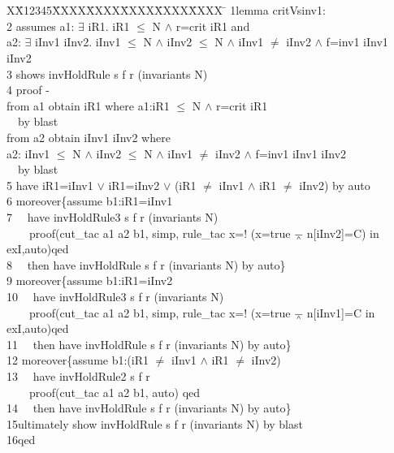 \documentclass{llncs}
\newlength{\fminilength}
\newenvironment{fmini}[1][\linewidth]
  {\setlength{\fminilength}{#1\fboxsep-2\fboxrule}%
   \vspace{2ex}\noindent\begin{lrbox}{\fminibox}\begin{minipage}{\fminilength}%
   \mbox{ }\hfill\vspace{-2.5ex}}%
  {\end{minipage}\end{lrbox}\vspace{1ex}\hspace{0ex}%
   \framebox{\usebox{\fminibox}}}
\newenvironment{specification}
{\noindent\scriptsize
\tt\begin{fmini}\begin{tabbing}X\=X12345\=XXXX\=XXXX\=XXXX\=XXXX\=XXXX
\=\+\kill} {\end{tabbing}\normalfont\end{fmini}}
\def \twoSpaces {\ \ }
\def \andc {\barwedge }
\def \negc {!}
\def \iInv {iInv}
\def \iR {iR}
\begin{document}
\begin{specification}
1lemma critVsinv1:\\
2  assumes  a1: $\exists$ \iR1. \iR1 $\le$ N $\wedge$ r=crit \iR1 and \\
  a2: $\exists$  \iInv1 \iInv2. \iInv1 $\le$ N $\wedge$ \iInv2 $\le$ N $\wedge$ \iInv1 $\neq$ \iInv2 $\wedge$ f=inv1  \iInv1 \iInv2\\
3  shows  invHoldRule s f r (invariants
  N)\\
4  proof -\\
   from a1 obtain \iR1 where a1:\iR1 $\le$ N $\wedge$ r=crit \iR1 \\
\twoSpaces   by blast\\
   from a2 obtain \iInv1 \iInv2 where \\
   a2: \iInv1 $\le$ N $\wedge$ \iInv2 $\le$ N $\wedge$ \iInv1 $\neq$ \iInv2 $\wedge$ f=inv1  \iInv1 \iInv2\\
\twoSpaces   by blast \\
5  have iR1=\iInv1 $\vee$ \iR1=\iInv2 $\vee$ (\iR1 $\ne$ \iInv1 $\wedge$  \iR1 $\ne$ \iInv2) by auto\\

6  moreover\{assume  b1:\iR1=\iInv1\\
7  \twoSpaces have invHoldRule3 s f r (invariants N)\\
 \twoSpaces  \twoSpaces   proof(cut\_tac a1 a2 b1, simp, rule\_tac x=$\negc$ (x=true $\andc$ n[\iInv2]=C)  in exI,auto)qed\\
8  \twoSpaces then have invHoldRule s f r
(invariants
  N)
by auto\}\\

9  moreover\{assume  b1:iR1=\iInv2\\
10 \twoSpaces have invHoldRule3 s f r (invariants N)\\
 \twoSpaces \twoSpaces   proof(cut\_tac a1 a2 b1, simp, rule\_tac x=$\negc$ (x=true $\andc$ n[\iInv1]=C  in exI,auto)qed\\
11 \twoSpaces then have invHoldRule s f r (invariants
  N)
by auto\}\\

12   moreover\{assume  b1:(\iR1 $\ne$  \iInv1 $\wedge$   \iR1 $\ne$  \iInv2)\\
13 \twoSpaces have invHoldRule2 s f r  \\
  \twoSpaces \twoSpaces  proof(cut\_tac a1 a2 b1,  auto) qed\\
14 \twoSpaces then have invHoldRule s f r
(invariants
  N)
by auto\} \\

15ultimately show invHoldRule s f r
(invariants N) by blast\\
16qed\\
\end{specification}
\end{document}
